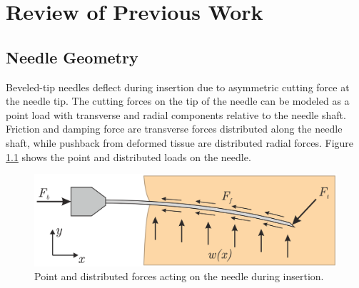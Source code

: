 \chapter{Review of Previous Work}
\label{sec:lit_review} %


\section{Needle Geometry}
Beveled-tip needles deflect during insertion due to asymmetric cutting force at the needle tip. The cutting forces on the tip of the needle can be modeled as a point load with transverse  and radial components relative to the needle shaft. Friction and damping force are transverse forces distributed along the needle shaft, while pushback from deformed tissue are distributed radial forces. Figure \ref{fig:needle_forces} shows the point and distributed loads on the needle.

\begin{figure}[h]
\includegraphics[width=1.0\textwidth]{Fig/chap2/roesthius_needle_forces.png}
\caption{Point and distributed forces acting on the needle during insertion\cite{roesthuis_mechanics-based_2012}.}
\label{fig:needle_forces}
\end{figure}

